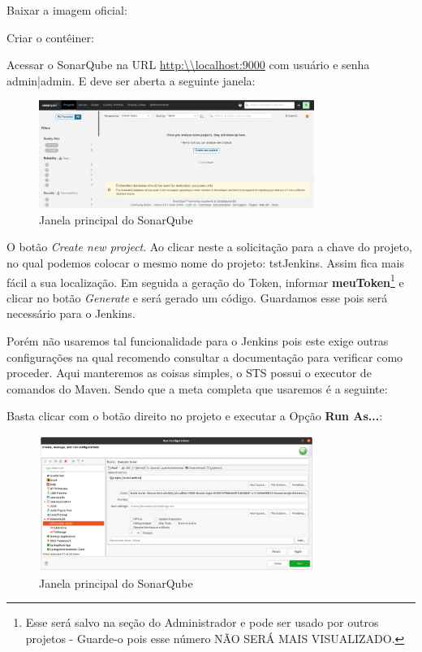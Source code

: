 \documentclass[a4paper,11pt]{article}
\begin{document}
Baixar a imagem oficial: \\

Criar o contêiner: \\

Acessar o SonarQube na URL \url{http:\\localhost:9000} com usuário e senha admin|admin. E deve ser aberta a seguinte janela:
\begin{figure}[H]
	\centering
	\includegraphics[width=0.8\textwidth]{imagens/sonar.png}
	\caption{Janela principal do SonarQube}
\end{figure}

O botão \textit{Create new project}. Ao clicar neste a solicitação para a chave do projeto, no qual podemos colocar o mesmo nome do projeto: tstJenkins. Assim fica mais fácil a sua localização. Em seguida a geração do Token, informar \textbf{meuToken}\footnote{Esse será salvo na seção do Administrador e pode ser usado por outros projetos - Guarde-o pois esse número NÃO SERÁ MAIS VISUALIZADO.} e clicar no botão \textit{Generate} e será gerado um código. Guardamos esse pois será necessário para o Jenkins.

Porém não usaremos tal funcionalidade para o Jenkins pois este exige outras configurações na qual recomendo consultar a documentação para verificar como proceder. Aqui manteremos as coisas simples, o STS possui o executor de comandos do Maven. Sendo que a meta completa que usaremos é a seguinte: \\

Basta clicar com o botão direito no projeto e executar a Opção \textbf{Run As...}:
\begin{figure}[H]
	\centering
	\includegraphics[width=0.8\textwidth]{imagens/sonarSTS.png}
	\caption{Janela principal do SonarQube}
\end{figure}
\end{document}
